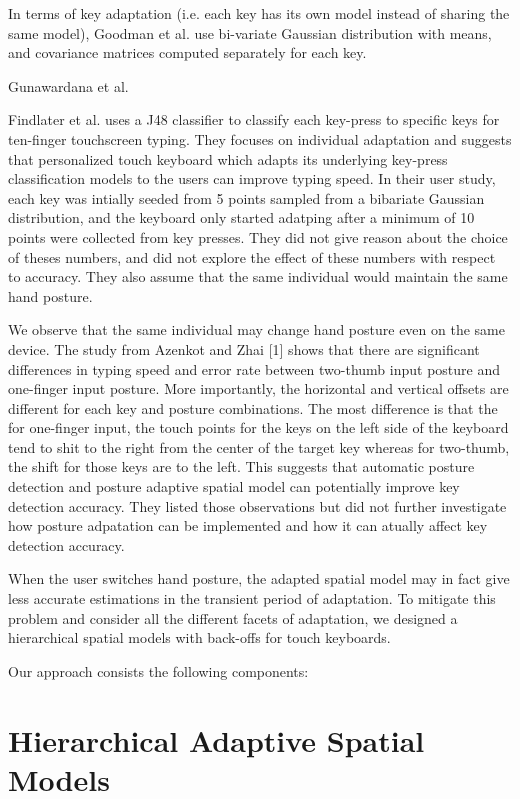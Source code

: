 \documentclass{sigchi}
\begin{document}
In terms of key adaptation (i.e. each key has its own model instead of
sharing the same model), Goodman et al. \cite{Goodman:2002} use bi-variate Gaussian distribution with means, and
covariance matrices computed separately for each key.


Gunawardana et al. 

Findlater et al. \cite{Findlater:2012} uses a J48 classifier to classify
each key-press to specific keys for ten-finger touchscreen typing. They
focuses on individual adaptation and suggests that personalized touch keyboard
which adapts its underlying key-press classification models to the users can improve typing speed.  
In their user study, each key was intially seeded from 5 points sampled from
a bibariate Gaussian distribution, and the keyboard only started adatping
after a minimum of 10 points were collected from key presses. They did not
give reason about the choice of theses numbers, and did not explore the
effect of these numbers with respect to accuracy. They also assume that the same
individual would maintain the same hand posture.

We observe that the same individual may change hand posture even on the same device. 
The study from Azenkot and Zhai [1] shows that there are significant differences 
in typing speed and error rate between two-thumb input posture and one-finger 
input posture. More importantly, the horizontal and vertical offsets are 
different for each key and posture combinations. The most difference is that the for
one-finger input, the touch points for the keys on the left side of the keyboard tend to
shit to the right from the center of the target key whereas for two-thumb, the shift for those
keys are to the left. This suggests that automatic posture detection and posture
adaptive spatial model can potentially improve key detection accuracy. They listed those observations but
did not further investigate how posture adpatation can be implemented and how it can atually
affect key detection accuracy.

When the user switches hand posture, the adapted spatial model may in fact give less accurate estimations in the transient period of adaptation. To mitigate this problem and consider all the different facets of adaptation, we designed a hierarchical spatial models with back-offs for touch keyboards.  

Our approach consists the following components:

\section{Hierarchical Adaptive Spatial Models}
\end{document}
